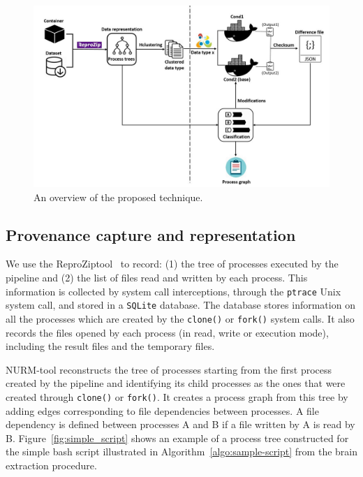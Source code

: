 \documentclass[a4paper,num-refs]{oup-contemporary}
\newcommand{\reprozip}[0]{ReproZip}
\begin{document}
\begin{figure}
\centering
  \includegraphics[width=\columnwidth]{images/overview.png}
  \caption{An overview of the proposed technique.}
  \label{fig:overview}
\end{figure}


\subsection{Provenance capture and representation}

We use the \reprozip tool~\cite{Chirigati2016} to record: (1) 
the tree of processes executed by the pipeline and (2) the list of 
files read and written by each process. This information is collected 
by system call interceptions, through the \texttt{ptrace} Unix system 
call, and stored in a \texttt{SQLite} database. The database stores 
information on all the processes which are created by the 
\texttt{clone()} or \texttt{fork()} system calls. It also records the 
files opened by each process (in read, write or execution mode), 
including the result files and the temporary files.

NURM-tool reconstructs the tree of processes starting from the first process 
created by the pipeline and identifying its child processes as the ones 
that were created through \texttt{clone()} or \texttt{fork()}. It 
creates a process graph from this tree by adding edges corresponding to 
file dependencies between processes. A file dependency is defined 
between processes A and B if a file written by A is read by B. 
Figure~\ref{fig:simple_script} shows an example of a process tree 
constructed for the simple bash script illustrated in 
Algorithm~\ref{algo:sample-script} from the brain extraction procedure.
\end{document}

